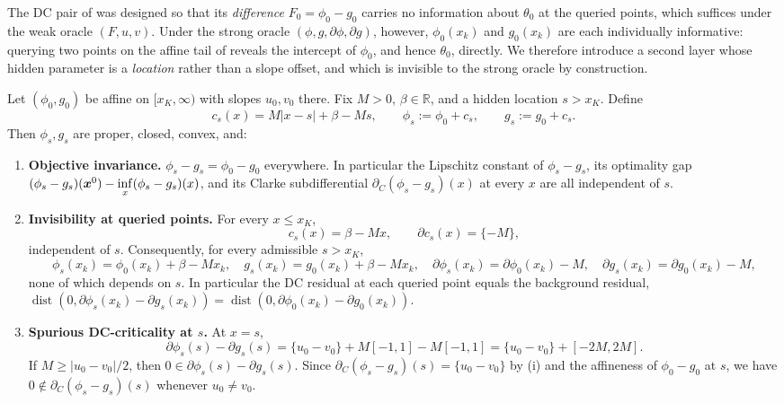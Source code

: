 The DC pair of  was designed so that
its \emph{difference} $F_0=\phi_0-g_0$ carries no information about
$\theta_0$ at the queried points, which suffices under the weak oracle
$(F,u,v)$. Under the strong oracle $(\phi,g,\partial\phi,\partial g)$,
however, $\phi_0(x_k)$ and $g_0(x_k)$ are each individually informative:
querying two points on the affine tail of  reveals
the intercept of $\phi_0$, and hence $\theta_0$, directly. We therefore
introduce a second layer whose hidden parameter is a \emph{location}
rather than a slope offset, and which is invisible to the strong oracle
by construction.

\begin{lemma}
\label{lem:common-kink}
Let $(\phi_0,g_0)$ be affine on $[x_K,\infty)$ with slopes $u_0,v_0$
there. Fix $M>0$, $\beta\in\mathbb R$, and a hidden location $s>x_K$.
Define
\[
    c_s(x)=M|x-s|+\beta-Ms,
    \qquad
    \phi_s:=\phi_0+c_s,
    \qquad
    g_s:=g_0+c_s.
\]
Then $\phi_s,g_s$ are proper, closed, convex, and:
\begin{enumerate}
\item[\textup{(i)}] \textbf{Objective invariance.} $\phi_s-g_s=\phi_0-g_0$ everywhere.
In particular the Lipschitz constant of $\phi_s-g_s$, its optimality gap
$(\phi_s-g_s)(\bm{x}^0)-\inf\limits_x(\phi_s-g_s)(x)$, and its Clarke subdifferential
$\partial_C(\phi_s-g_s)(x)$ at every $x$ are all independent of $s$.
\item[\textup{(ii)}] \textbf{Invisibility at queried points.} For every
$x\le x_K$,
\[
    c_s(x)=\beta-Mx,
    \qquad
    \partial c_s(x)=\{-M\},
\]
independent of $s$. Consequently, for every admissible $s>x_K$,
\[
    \phi_s(x_k)=\phi_0(x_k)+\beta-Mx_k,
    \quad
    g_s(x_k)=g_0(x_k)+\beta-Mx_k,
    \quad
    \partial\phi_s(x_k)=\partial\phi_0(x_k)-M,
    \quad
    \partial g_s(x_k)=\partial g_0(x_k)-M,
\]
none of which depends on $s$. In particular the DC residual at each
queried point equals the background residual,
$\operatorname{dist}(0,\partial\phi_s(x_k)-\partial g_s(x_k))
=\operatorname{dist}(0,\partial\phi_0(x_k)-\partial g_0(x_k))$.
\item[\textup{(iii)}] \textbf{Spurious DC-criticality at $s$.} At $x=s$,
\[
    \partial\phi_s(s)-\partial g_s(s)
    =
    \{u_0-v_0\}+M[-1,1]-M[-1,1]
    =
    \{u_0-v_0\}+[-2M,2M].
\]
If $M\ge|u_0-v_0|/2$, then $0\in\partial\phi_s(s)-\partial g_s(s)$. Since
$\partial_C(\phi_s-g_s)(s)=\{u_0-v_0\}$ by (i) and the affineness of
$\phi_0-g_0$ at $s$, we have $0\notin\partial_C(\phi_s-g_s)(s)$ whenever
$u_0\ne v_0$.
\end{enumerate}
\end{lemma}

